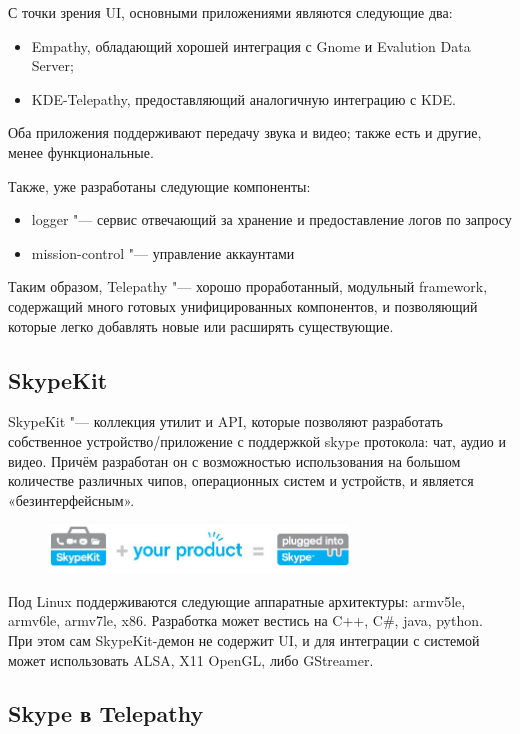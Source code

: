 \documentclass[10pt, a5paper]{article}
\begin{document}
С точки зрения UI, основными приложениями являются следующие два:
\begin{itemize}
\item Empathy, обладающий хорошей интеграция с Gnome и Evalution Data Server;
\item KDE-Telepathy, предоставляющий аналогичную интеграцию с KDE.
\end{itemize}

Оба приложения поддерживают передачу звука и видео; также есть и другие, менее функциональные.

Также, уже разработаны следующие компоненты:
\begin{itemize}
\item logger "--- сервис отвечающий за хранение и предоставление логов по запросу
\item mission-control "--- управление аккаунтами
\end{itemize}

Таким образом, Telepathy "--- хорошо проработанный, модульный framework, содержащий много готовых унифицированных компонентов, и позволяющий которые легко добавлять новые или расширять существующие.

\subsection*{SkypeKit}
SkypeKit "--- коллекция утилит и API, которые позволяют разработать собственное устройство/приложение с поддержкой skype протокола: чат, аудио и видео. Причём разработан он с возможностью использования на большом количестве различных чипов, операционных систем и устройств, и является «безинтерфейсным».
\begin{figure}[b]
  \centering
  \includegraphics[width=8cm]{101_2013_w_Melnikau_skypekit}
\end{figure}
Под Linux поддерживаются следующие аппаратные архитектуры: armv5le,
armv6le, armv7le, x86. Разработка может вестись на C++, C\#, java, python. При этом сам SkypeKit-демон не содержит UI, и для интеграции с системой может использовать ALSA, X11 OpenGL, либо GStreamer.

\subsection*{Skype в Telepathy}
\end{document}
